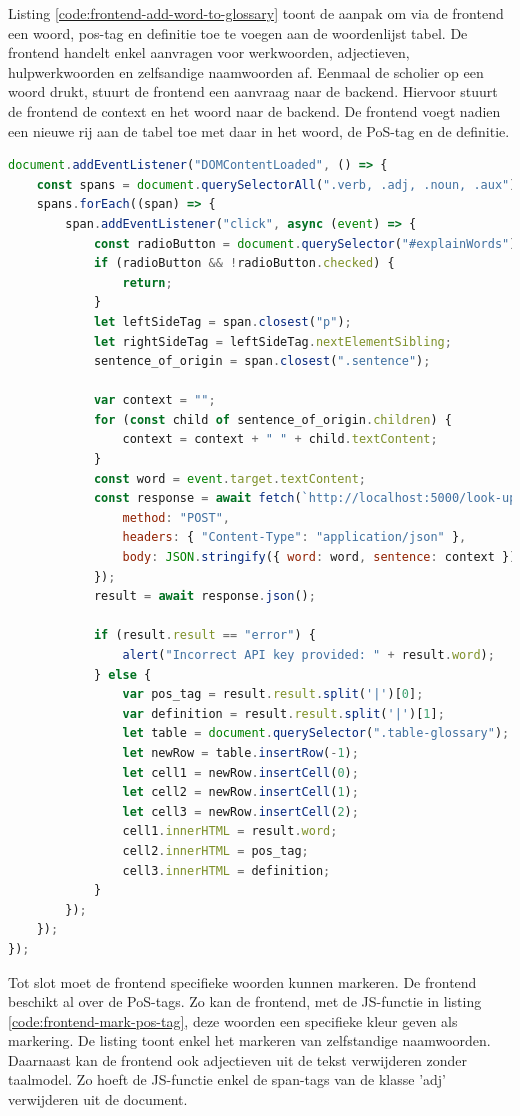 \medspace

Listing \ref{code:frontend-add-word-to-glossary} toont de aanpak om via de frontend een woord, pos-tag en definitie toe te voegen aan de woordenlijst tabel. De frontend handelt enkel aanvragen voor werkwoorden, adjectieven, hulpwerkwoorden en zelfsandige naamwoorden af. Eenmaal de scholier op een woord drukt, stuurt de frontend een aanvraag naar de backend. Hiervoor stuurt de frontend de context en het woord naar de backend. De frontend voegt nadien een nieuwe rij aan de tabel toe met daar in het woord, de PoS-tag en de definitie.

\begin{lstlisting}[language=javascript, caption={Een woord aan de woordenlijst toevoegen in het scholierencomponent.}, label={code:frontend-add-word-to-glossary}]
document.addEventListener("DOMContentLoaded", () => {
	const spans = document.querySelectorAll(".verb, .adj, .noun, .aux");
	spans.forEach((span) => {
		span.addEventListener("click", async (event) => {
			const radioButton = document.querySelector("#explainWords");
			if (radioButton && !radioButton.checked) {
				return;
			}
			let leftSideTag = span.closest("p");
			let rightSideTag = leftSideTag.nextElementSibling;
			sentence_of_origin = span.closest(".sentence");
			
			var context = "";
			for (const child of sentence_of_origin.children) {
				context = context + " " + child.textContent;
			}
			const word = event.target.textContent;
			const response = await fetch(`http://localhost:5000/look-up-word`, {
				method: "POST",
				headers: { "Content-Type": "application/json" },
				body: JSON.stringify({ word: word, sentence: context }),
			});
			result = await response.json();
			
			if (result.result == "error") {
				alert("Incorrect API key provided: " + result.word);
			} else {
				var pos_tag = result.result.split('|')[0];
				var definition = result.result.split('|')[1];
				let table = document.querySelector(".table-glossary");
				let newRow = table.insertRow(-1);
				let cell1 = newRow.insertCell(0);
				let cell2 = newRow.insertCell(1);
				let cell3 = newRow.insertCell(2);
				cell1.innerHTML = result.word;
				cell2.innerHTML = pos_tag;
				cell3.innerHTML = definition;
			}
		});
	});
});
\end{lstlisting}


Tot slot moet de frontend specifieke woorden kunnen markeren. De frontend beschikt al over de PoS-tags. Zo kan de frontend, met de JS-functie in listing \ref{code:frontend-mark-pos-tag}, deze woorden een specifieke kleur geven als markering. De listing toont enkel het markeren van zelfstandige naamwoorden. Daarnaast kan de frontend ook adjectieven uit de tekst verwijderen zonder taalmodel. Zo hoeft de JS-functie enkel de span-tags van de klasse 'adj' verwijderen uit de document.

